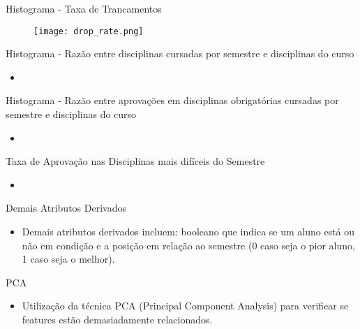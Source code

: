 \begin{frame}{Histograma - Taxa de Trancamentos}
    \begin{figure}[!ht]
    \centering
    \texttt{[image: drop\_rate.png]}
    \end{figure}
\end{frame}

\begin{frame}{Histograma - Razão entre disciplinas cursadas por semestre e
    disciplinas do curso}
\begin{itemize}[itemsep=3ex]
        \item <Por histograma aqui>
\end{itemize}
\end{frame}

\begin{frame}{Histograma - Razão entre aprovações em disciplinas obrigatórias cursadas 
        por semestre e disciplinas do curso}
\begin{itemize}[itemsep=3ex]
        \item <Por histograma aqui>
\end{itemize}
\end{frame}

\begin{frame}{Taxa de Aprovação nas Disciplinas mais difíceis do Semestre}
\begin{itemize}[itemsep=3ex]
        \item <Por histograma aqui>
\end{itemize}
\end{frame}

\begin{frame}{Demais Atributos Derivados}
\begin{itemize}[itemsep=3ex]
        \item Demais atributos derivados incluem: booleano que indica se um aluno
            está ou não em condição e 
            a posição em relação ao semestre (0 caso seja o pior aluno, 1 caso seja o
            melhor).
\end{itemize}
\end{frame}

\begin{frame}{PCA}
\begin{itemize}[itemsep=3ex]
    \item Utilização da técnica PCA (Principal Component Analysis) para verificar se
        features estão demasiadamente relacionados. 
\end{itemize}
\end{frame}

